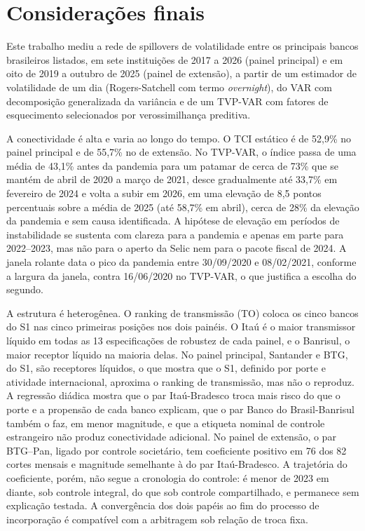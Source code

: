 \section{Considerações finais}
\label{sec:consideracoes}

Este trabalho mediu a rede de spillovers de volatilidade entre os principais
bancos brasileiros listados, em sete instituições de 2017 a 2026 (painel
principal) e em oito de 2019 a outubro de 2025 (painel de extensão), a partir de um
estimador de volatilidade de um dia (Rogers-Satchell com termo \textit{overnight}),
do VAR com decomposição generalizada da variância e de um TVP-VAR com fatores de
esquecimento selecionados por verossimilhança preditiva.

A conectividade é alta e varia ao longo do tempo. O TCI estático é de 52,9\% no
painel principal e de 55,7\% no de extensão. No TVP-VAR, o índice passa de uma média
de 43,1\% antes da pandemia para um patamar de cerca de 73\% que se mantém de abril
de 2020 a março de 2021, desce gradualmente até 33,7\% em fevereiro de 2024 e volta a
subir em 2026, em uma elevação de 8,5 pontos percentuais sobre a média de 2025 (até
58,7\% em abril), cerca de 28\% da elevação da pandemia e sem causa identificada. A
hipótese de elevação em períodos de instabilidade se sustenta com clareza para a
pandemia e apenas em parte para 2022--2023, mas não para o aperto da Selic nem para
o pacote fiscal de 2024. A janela rolante data o pico da pandemia
entre 30/09/2020 e 08/02/2021, conforme a largura da janela, contra 16/06/2020 no
TVP-VAR, o que justifica a escolha do segundo.

A estrutura é heterogênea. O ranking de transmissão (TO) coloca os cinco bancos do
S1 nas cinco primeiras posições nos dois painéis. O Itaú é o maior transmissor
líquido em todas as 13 especificações de robustez de cada painel, e o Banrisul, o
maior receptor líquido na maioria delas. No painel principal, Santander e BTG, do S1,
são receptores líquidos, o que mostra que o S1, definido por porte e atividade
internacional, aproxima o ranking de transmissão, mas não o reproduz. A regressão
diádica mostra que o par Itaú-Bradesco troca mais risco do que o porte e a propensão
de cada banco explicam, que o par Banco do Brasil-Banrisul também o faz, em menor
magnitude, e que a etiqueta nominal de controle estrangeiro não produz conectividade
adicional. No painel de extensão, o par BTG--Pan, ligado por controle societário, tem
coeficiente positivo em 76 dos 82 cortes mensais e magnitude semelhante à do par
Itaú-Bradesco. A trajetória do coeficiente, porém, não segue a cronologia do controle: é menor
de 2023 em diante, sob controle integral, do que sob controle compartilhado, e permanece sem
explicação testada. A convergência dos dois papéis ao fim do processo de incorporação é
compatível com a arbitragem sob relação de troca fixa.

